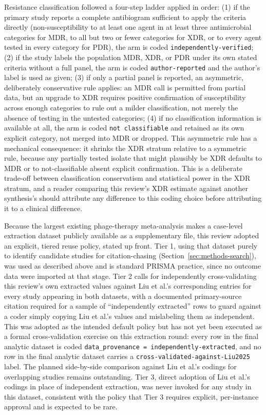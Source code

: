 Resistance classification followed a four-step ladder applied in order: (1) if the primary study reports a complete antibiogram sufficient to apply the \textcite{Magiorakos2012_mdrxdr} criteria directly (non-susceptibility to at least one agent in at least three antimicrobial categories for MDR, to all but two or fewer categories for XDR, or to every agent tested in every category for PDR), the arm is coded \texttt{independently-verified}; (2) if the study labels the population MDR, XDR, or PDR under its own stated criteria without a full panel, the arm is coded \texttt{author-reported} and the author's label is used as given; (3) if only a partial panel is reported, an asymmetric, deliberately conservative rule applies: an MDR call is permitted from partial data, but an upgrade to XDR requires positive confirmation of susceptibility across enough categories to rule out a milder classification, not merely the absence of testing in the untested categories; (4) if no classification information is available at all, the arm is coded \texttt{not classifiable} and retained as its own explicit category, not merged into MDR or dropped. This asymmetric rule has a mechanical consequence: it shrinks the XDR stratum relative to a symmetric rule, because any partially tested isolate that might plausibly be XDR defaults to MDR or to not-classifiable absent explicit confirmation. This is a deliberate trade-off between classification conservatism and statistical power in the XDR stratum, and a reader comparing this review's XDR estimate against another synthesis's should attribute any difference to this coding choice before attributing it to a clinical difference.

Because the largest existing phage-therapy meta-analysis \parencite{Liu2025_ijaa} makes a case-level extraction dataset publicly available as a supplementary file, this review adopted an explicit, tiered reuse policy, stated up front. Tier 1, using that dataset purely to identify candidate studies for citation-chasing (Section~\ref{sec:methods-search}), was used as described above and is standard PRISMA practice, since no outcome data were imported at that stage. Tier 2 calls for independently cross-validating this review's own extracted values against Liu et al.'s corresponding entries for every study appearing in both datasets, with a documented primary-source citation required for a sample of ``independently extracted'' rows to guard against a coder simply copying Liu et al.'s values and mislabeling them as independent. This was adopted as the intended default policy but has not yet been executed as a formal cross-validation exercise on this extraction round: every row in the final analytic dataset is coded \texttt{data\_provenance = independently-extracted}, and no row in the final analytic dataset carries a \texttt{cross-validated-against-Liu2025} label. The planned side-by-side comparison against Liu et al.'s codings for overlapping studies remains outstanding. Tier 3, direct adoption of Liu et al.'s codings in place of independent extraction, was never invoked for any study in this dataset, consistent with the policy that Tier 3 requires explicit, per-instance approval and is expected to be rare.

